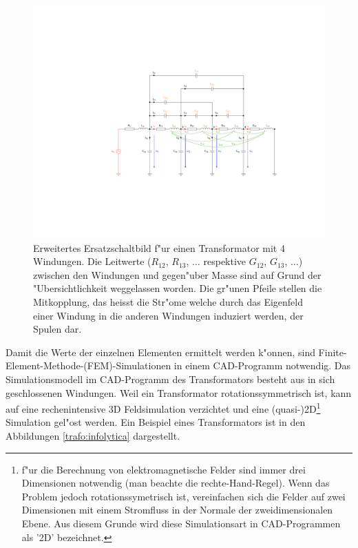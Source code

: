 \begin{refsection}
\begin{figure}
	\centering
	\includegraphics[width=\hsize]{./trafo/images/Trafo_Modell.pdf}
	\caption[Erweitertes Ersatzschaltbild f"ur einen Transformator]{Erweitertes Ersatzschaltbild f"ur einen Transformator mit 4 Windungen. Die Leitwerte ($R_{12}$, $R_{13}$, $\dots$ respektive $G_{12}$, $G_{13}$, $\dots$) zwischen den Windungen und gegen"uber Masse sind auf Grund der "Ubersichtlichkeit weggelassen worden. Die gr"unen Pfeile stellen die Mitkopplung, das heisst die Str"ome welche durch das Eigenfeld einer Windung in die anderen Windungen induziert werden, der Spulen dar. }
	\label{trafo:erweitertes_ESB}
\end{figure}

Damit die Werte der einzelnen Elementen ermittelt werden k"onnen, sind Finite-Element-Methode-(FEM)-Simulationen in einem CAD-Programm notwendig. Das Simulationsmodell im CAD-Programm des Transformators besteht aus in sich geschlossenen Windungen. Weil ein Transformator rotationssymmetrisch ist, kann auf eine rechenintensive 3D Feldsimulation verzichtet und eine (quasi-)2D\footnote{f"ur die Berechnung von elektromagnetische Felder sind immer drei Dimensionen notwendig (man beachte die rechte-Hand-Regel). Wenn das Problem jedoch rotationssymetrisch ist, vereinfachen sich die Felder auf zwei Dimensionen mit einem Stromfluss in der Normale der zweidimensionalen Ebene. Aus diesem Grunde wird diese Simulationsart in CAD-Programmen als '2D' bezeichnet.} Simulation gel"ost werden. Ein Beispiel eines Transformators ist in den Abbildungen \ref{trafo:infolytica} dargestellt.


\end{refsection}
